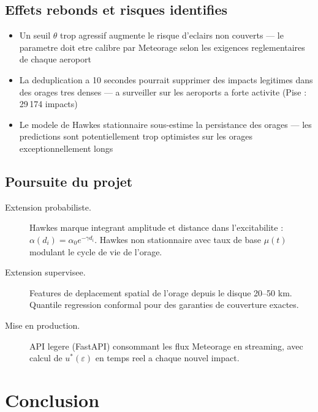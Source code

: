 \documentclass[a4paper,11pt]{article}
\begin{document}
\subsection{Effets rebonds et risques identifies}

\begin{itemize}
  \item Un seuil $\theta$ trop agressif augmente le risque d'eclairs non
        couverts --- le parametre doit etre calibre par Meteorage selon les
        exigences reglementaires de chaque aeroport
  \item La deduplication a 10 secondes pourrait supprimer des impacts legitimes
        dans des orages tres denses --- a surveiller sur les aeroports a forte
        activite (Pise : 29\,174 impacts)
  \item Le modele de Hawkes stationnaire sous-estime la persistance des orages
        --- les predictions sont potentiellement trop optimistes sur les orages
        exceptionnellement longs
\end{itemize}

\subsection{Poursuite du projet}

\begin{description}
  \item[Extension probabiliste.] Hawkes marque integrant amplitude et distance
        dans l'excitabilite : $\alpha(d_i) = \alpha_0 e^{-\gamma d_i}$. Hawkes
        non stationnaire avec taux de base $\mu(t)$ modulant le cycle de vie de
        l'orage.
  \item[Extension supervisee.] Features de deplacement spatial de l'orage
        depuis le disque 20--50 km. Quantile regression conformal pour des
        garanties de couverture exactes.
  \item[Mise en production.] API legere (FastAPI) consommant les flux Meteorage
        en streaming, avec calcul de $u^*(\varepsilon)$ en temps reel a chaque
        nouvel impact.
\end{description}

\section{Conclusion}
\end{document}
